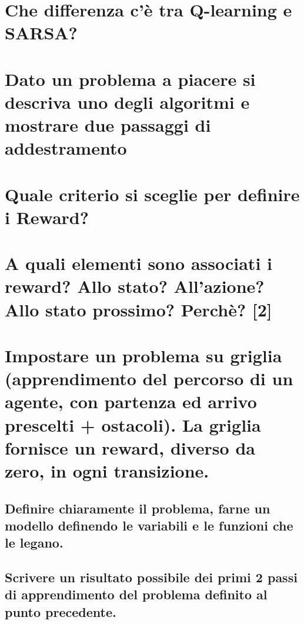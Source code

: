 \documentclass[\main/main.tex]{subfiles}
\begin{document}
\section{Che differenza c'è tra Q-learning e SARSA?}
\section{Dato un problema a piacere si descriva uno degli algoritmi e mostrare due passaggi di addestramento}
\section{Quale criterio si sceglie per definire i Reward?}
\section{A quali elementi sono associati i reward? Allo stato? All'azione? Allo stato prossimo? Perchè? [2]}
\section{Impostare un problema su griglia (apprendimento del percorso di un agente, con partenza ed arrivo prescelti + ostacoli). La griglia fornisce un reward, diverso da zero, in ogni transizione.}
\subsection{Definire chiaramente il problema, farne un modello definendo le variabili e le funzioni che le legano.}
\subsection{Scrivere un risultato possibile dei primi 2 passi di apprendimento del problema definito al punto precedente.} 
\end{document}
